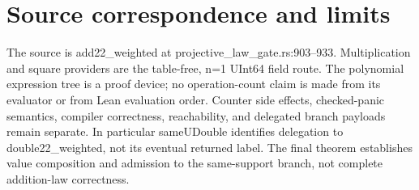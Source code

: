 \documentclass[10pt]{article}
\begin{document}
\section*{Source correspondence and limits}
The source is add22\_weighted at projective\_law\_gate.rs:903--933. Multiplication and square providers are the table-free, n=1 UInt64 field route. The polynomial expression tree is a proof device; no operation-count claim is made from its evaluator or from Lean evaluation order. Counter side effects, checked-panic semantics, compiler correctness, reachability, and delegated branch payloads remain separate. In particular sameUDouble identifies delegation to double22\_weighted, not its eventual returned label. The final theorem establishes value composition and admission to the same-support branch, not complete addition-law correctness.
\end{document}
